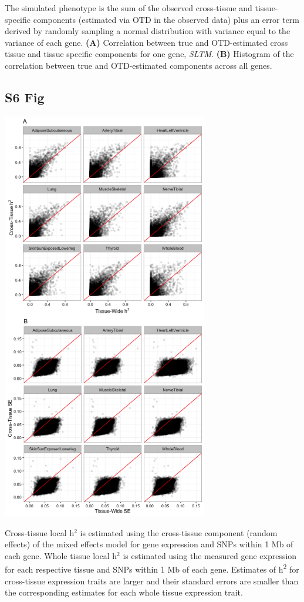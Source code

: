 \documentclass[10pt,letterpaper]{article}
\begin{document}
\begin{singlespace}
 The simulated phenotype is the sum of the observed cross-tissue and tissue-specific components (estimated via OTD in the observed data) plus an error term derived by randomly sampling a normal distribution with variance equal to the variance of each gene. {\bf (A)} Correlation between true and OTD-estimated cross tissue and tissue specific components for one gene, \textit{SLTM}.  {\bf(B)} Histogram of the correlation between true and OTD-estimated components across all genes.

\subsection*{S6 Fig}
\includegraphics[width=9cm]{Figures/GenArch_Supp/S3Fig.png}
\label{S6_Fig}

 Cross-tissue local h$^2$ is estimated using the cross-tissue component (random effects) of the mixed effects model for gene expression and SNPs within 1 Mb of each gene. Whole tissue local h$^2$ is estimated using the measured gene expression for each respective tissue and SNPs within 1 Mb of each gene. Estimates of h\textsuperscript{2} for cross-tissue expression traits are larger and their standard errors are smaller than the corresponding estimates for each whole tissue expression trait.


\end{singlespace}
\end{document}
